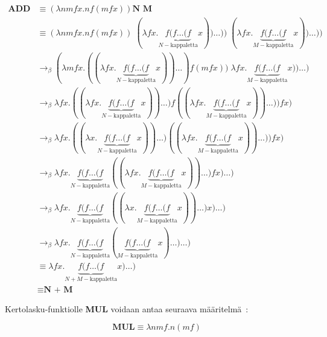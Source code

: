 \begin{esim}
\begin{align*} \textbf{ADD N M} &\equiv (\lambda nmfx . n f (m f x)) \textbf{N M} \\ 
&\equiv  (\lambda nmfx . n f (m f x)) \; (\lambda fx . \underbrace{ f ( f \ldots (f }_{ N-\text{kappaletta}} x)) \ldots )) \; (\lambda fx . \underbrace{ f ( f \ldots (f }_{ M-\text{kappaletta}} x)) \ldots ))\\ 
&\rightarrow_{\beta} (\lambda mfx . ((\lambda fx . \underbrace{ f ( f \ldots (f }_{ N-\text{kappaletta}} x)) \ldots ) f (m f x)) \; \lambda fx . \underbrace{ f ( f \ldots (f }_{ M-\text{kappaletta}} x)) \ldots )\\ 
&\rightarrow_{\beta} \lambda fx . ((\lambda fx . \underbrace{ f ( f \ldots (f }_{ N-\text{kappaletta}} x)) \ldots ) f ( (\lambda fx . \underbrace{ f ( f \ldots (f }_{ M-\text{kappaletta}} x)) \ldots )) f x ) \\
&\rightarrow_{\beta} \lambda fx . ((\lambda x . \underbrace{ f ( f \ldots (f }_{ N-\text{kappaletta}} x)) \ldots ) ( (\lambda fx . \underbrace{ f ( f \ldots (f }_{ M-\text{kappaletta}} x)) \ldots )) f x ) \\
&\rightarrow_{\beta}  \lambda fx . \underbrace{ f ( f \ldots (f }_{ N-\text{kappaletta}} ( (\lambda fx . \underbrace{ f ( f \ldots (f }_{ M-\text{kappaletta}} x)) \ldots ) f x ) \ldots )\\
&\rightarrow_{\beta}  \lambda fx . \underbrace{ f ( f \ldots (f }_{ N-\text{kappaletta}} ( (\lambda x . \underbrace{ f ( f \ldots (f }_{ M-\text{kappaletta}} x)) \ldots )  x ) \ldots) \\
&\rightarrow_{\beta}  \lambda fx . \underbrace{ f ( f \ldots (f }_{ N-\text{kappaletta}} (\underbrace{ f ( f \ldots (f }_{ M-\text{kappaletta}} x) \ldots ) \ldots ) \\
&\equiv \lambda fx . \underbrace{ f ( f \ldots (f }_{ N + M-\text{kappaletta}} x) \ldots ) \\
&\equiv \textbf{N + M}  
\end{align*}

Kertolasku-funktiolle \textbf{MUL} voidaan antaa seuraava määritelmä~\cite[s.~20]{Sel2013}:

\[ \textbf{MUL} \equiv \lambda n m f . n (mf) \]


\end{esim}
